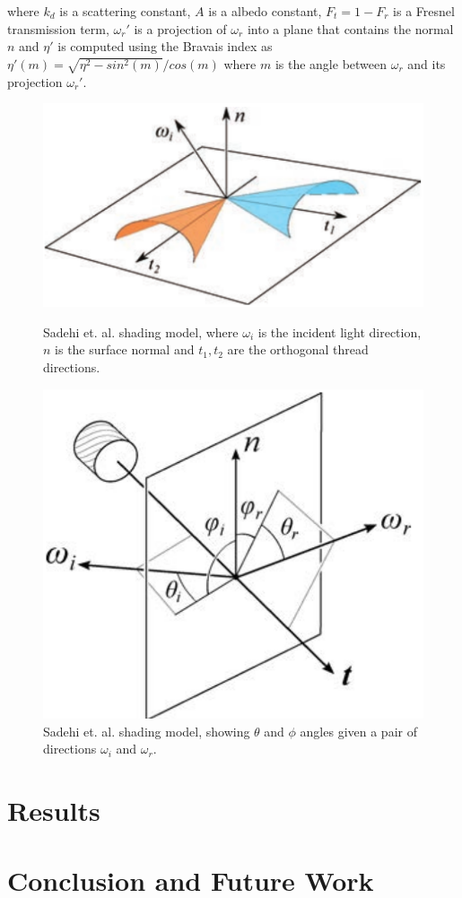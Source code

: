 \documentclass[12pt]{article}
\begin{document}
where $k_d$ is a scattering constant, $A$ is a albedo constant, $F_t = 1 - F_r$ is a Fresnel transmission term, $\omega_r'$ is a projection of $\omega_r$ into a plane that contains the normal $n$ and $\eta'$ is computed using the Bravais index\cite{Marschner2003} as $\eta'(m) = \sqrt{\eta^2 - sin^2(m)}  / cos(m)$ where $m$ is the angle between $\omega_r$ and its projection $\omega_r'$. 

\begin{figure}[ht!]
\begin{minipage}[b]{.45\textwidth}
\centering
\includegraphics[width=1\textwidth]{images/microcylinders}
	\caption{Sadehi et. al. \cite{Sadeghi2013} shading model, where $\omega_i$ is the incident light direction, $n$ is the surface normal and $t_1,t_2$ are the orthogonal thread directions.}
	\label{fig:microcylinders}
\end{minipage}
\hfill
\begin{minipage}[b]{.45\textwidth}
\centering
\includegraphics[width=1\textwidth]{images/cloth_directions}
	\caption{Sadehi et. al. \cite{Sadeghi2013} shading model, showing $\theta$ and $\phi$ angles given a pair of directions $\omega_i$ and $\omega_r$.}
	\label{fig:cloth_directions}
\end{minipage}
\end{figure}

\section{Results}

\section{Conclusion and Future Work}



\end{document}
